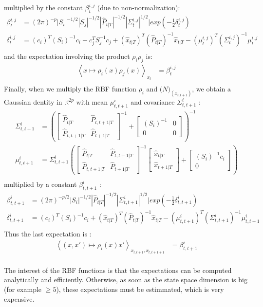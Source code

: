 multiplied by the constant $\beta^{i,j}_t$ (due to non-normalization):
\begin{align*}
  \beta^{i,j}_t &= (2\pi)^{-p} |S_i|^{-1/2} |S_j|^{-1/2} |\hat{P}_{t|T}|^{-1/2} |\Sigma^{i,j}_t|^{1/2}| exp(-\frac{1}{2} \delta^{i,j}_t)\\
  \delta^{i,j}_t &= (c_i)^T (S_i)^{-1} c_i + c_j^T S_j^{-1} c_j + (\hat{x}_{t|T})^T (\hat{P}_{t|T})^{-1} \hat{x}_{t|T} - (\mu^{i,j}_t)^T (\Sigma^{i,j}_t)^{-1} \mu^{i,j}_t\\
\end{align*}
and the expectation involving the product $\rho_i \rho_j$ is:
\begin{align*}
  \left< x \mapsto \rho_i(x)\rho_j(x)\right>_{x_t} &= \beta^{i,j}_t\\
\end{align*}
Finally, when we multiply the RBF function $\rho_i$ and $\mathcal(N)_{(x_{t,t+1})}$, we obtain a Gaussian dentity in $\mathbb{R}^{2p}$ with mean $\mu^i_{t,t+1}$ and covariance $\Sigma^i_{t,t+1}$ :
\begin{align*}
  \Sigma^i_{t,t+1} &=
    \left(
      \left[
        \begin{array}{cc} \hat{P}_{t|T} & \hat{P}_{t,t+1|T}\\ \hat{P}_{t,t+1|T} & \hat{P}_{t+1|T} \end{array}
      \right]^{-1}
       +
      \left[
        \begin{array}{cc} (S_i)^{-1} & 0\\ 0 & 0 \end{array}
      \right]
    \right)^{-1}
  \\
  \mu^i_{t,t+1} &= \Sigma^i_{t,t+1}
    \left(
      \left[
        \begin{array}{cc} \hat{P}_{t|T} & \hat{P}_{t,t+1|T}\\ \hat{P}_{t,t+1|T} & \hat{P}_{t+1|T} \end{array}
      \right]^{-1}
      \left[
        \begin{array}{c} \hat{x}_{t|T} \\ \hat{x}_{t+1|T} \end{array}
      \right] +
      \left[
        \begin{array}{c} (S_i)^{-1}c_i \\ 0 \end{array}
      \right]
    \right)
  \\
\end{align*}
multiplied by a constant $\beta^{i}_{t,t+1}$ :
\begin{align*}
  \beta^i_{t,t+1} &= (2\pi)^{-p/2} |S_i|^{-1/2} |\hat{P}_{t|T}|^{-1/2} |\Sigma^i_{t,t+1}|^{1/2}| exp(-\frac{1}{2} \delta^i_{t,t+1})\\
  \delta^i_{t,t+1} &= (c_i)^T (S_i)^{-1} c_i + (\hat{x}_{t|T})^T (\hat{P}_{t|T})^{-1} \hat{x}_{t|T} - (\mu^i_{t,t+1})^T (\Sigma^i_{t,t+1})^{-1} \mu^i_{t,t+1}\\
\end{align*}
Thus the last expectation is :
\begin{align*}
  \left< (x,x') \mapsto \rho_i(x) x' \right>_{x_{t,t+1},x_{t,t+1+1}} &= \beta^i_{t,t+1}\\
\end{align*}

The interest of the RBF functions is that the expectations can be computed analytically and efficiently.
Otherwise, as soon as the state space dimension is big (for example $\geq 5$), these expectations must be estimmated, which is very expensive.

